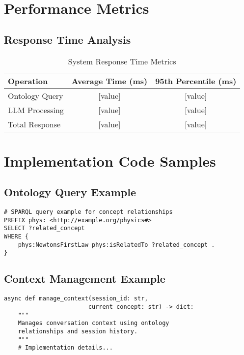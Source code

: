 \section{Performance Metrics}
\label{sec:performance-metrics}

\subsection{Response Time Analysis}
\begin{table}[h]
    \centering
    \caption{System Response Time Metrics}
    \label{tab:response-times}
    \begin{tabular}{lcc}
        \toprule
        \textbf{Operation} & \textbf{Average Time (ms)} & \textbf{95th Percentile (ms)} \\
        \midrule
        Ontology Query & [value] & [value] \\
        LLM Processing & [value] & [value] \\
        Total Response & [value] & [value] \\
        \bottomrule
    \end{tabular}
\end{table}

\section{Implementation Code Samples}
\label{sec:code-samples}

\subsection{Ontology Query Example}
\begin{verbatim}
# SPARQL query example for concept relationships
PREFIX phys: <http://example.org/physics#>
SELECT ?related_concept
WHERE {
    phys:NewtonsFirstLaw phys:isRelatedTo ?related_concept .
}
\end{verbatim}

\subsection{Context Management Example}
\begin{verbatim}
async def manage_context(session_id: str, 
                        current_concept: str) -> dict:
    """
    Manages conversation context using ontology
    relationships and session history.
    """
    # Implementation details...
\end{verbatim}

